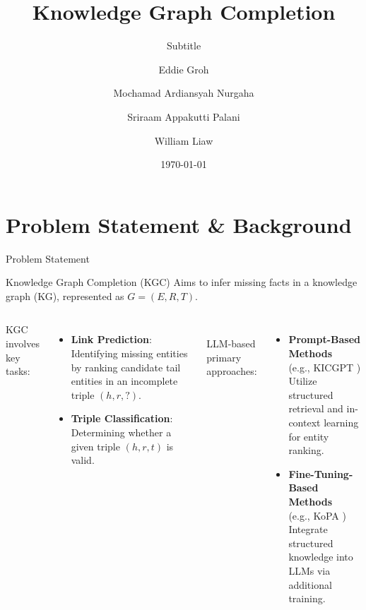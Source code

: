 \documentclass[aspectratio=169,xcolor=dvipsnames]{beamer}
\title{Knowledge Graph Completion}
\subtitle{Subtitle}
\author{Eddie Groh \and Mochamad Ardiansyah Nurgaha \and Sriraam Appakutti Palani \and William Liaw}
\institute[Team: AWESome]
{
    Mehwish ALAM\\
    Associate Professor
    \and
    Language Models and Structured Data\\
}
\date{\today}
\begin{document}
\begin{frame}
    \titlepage
\end{frame}




\section{Problem Statement \& Background}
\begin{frame}{Problem Statement}
    \begin{block}{Knowledge Graph Completion (KGC)}
        Aims to infer missing facts in a knowledge graph (KG), represented as \( G = (E, R, T) \).
    \end{block}

    \begin{columns}[c]
        KGC involves key tasks:
        \begin{itemize}
            \item \textbf{Link Prediction}: Identifying missing entities by ranking candidate tail entities in an incomplete triple \( (h, r, ?) \).
            \item \textbf{Triple Classification}: Determining whether a given triple \( (h, r, t) \) is valid.
        \end{itemize}
        \\LLM-based primary approaches:
        \begin{itemize}
            \item \textbf{Prompt-Based Methods} \\(e.g., KICGPT \cite{wei2023kicgpt})\\ Utilize structured retrieval and in-context learning for entity ranking.
            \item \textbf{Fine-Tuning-Based Methods} \\(e.g., KoPA \cite{qin2023kopa})\\ Integrate structured knowledge into LLMs via additional training.
        \end{itemize}
    \end{columns}
\end{frame}
\end{document}
